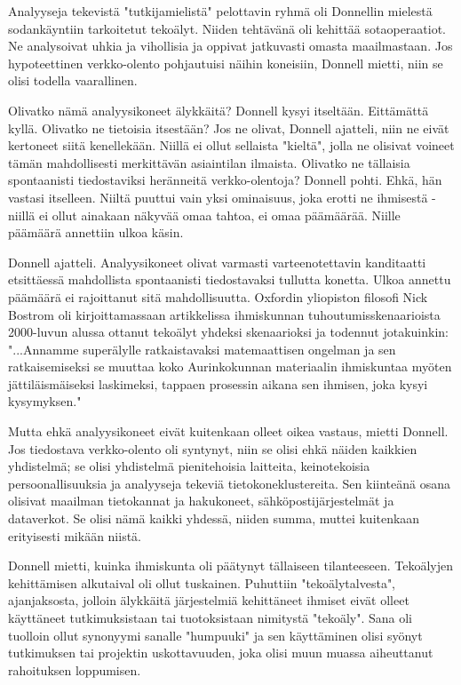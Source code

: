Analyyseja tekevistä "tutkijamielistä" pelottavin ryhmä oli Donnellin mielestä sodankäyntiin tarkoitetut tekoälyt. Niiden tehtävänä oli kehittää sotaoperaatiot. Ne analysoivat uhkia ja vihollisia ja oppivat jatkuvasti omasta maailmastaan. Jos hypoteettinen verkko-olento pohjautuisi näihin koneisiin, Donnell mietti, niin se olisi todella vaarallinen.


Olivatko nämä analyysikoneet älykkäitä? Donnell kysyi itseltään. Eittämättä kyllä. Olivatko ne tietoisia itsestään? Jos ne olivat, Donnell ajatteli, niin ne eivät kertoneet siitä kenellekään. Niillä ei ollut sellaista "kieltä", jolla ne olisivat voineet tämän mahdollisesti merkittävän asiaintilan ilmaista. Olivatko ne tällaisia spontaanisti tiedostaviksi heränneitä verkko-olentoja? Donnell pohti. Ehkä, hän vastasi itselleen. Niiltä puuttui vain yksi ominaisuus, joka erotti ne ihmisestä - niillä ei ollut ainakaan näkyvää omaa tahtoa, ei omaa päämäärää. Niille päämäärä annettiin ulkoa käsin.


Donnell ajatteli. Analyysikoneet olivat varmasti varteenotettavin kanditaatti etsittäessä mahdollista spontaanisti tiedostavaksi tullutta konetta. Ulkoa annettu päämäärä ei rajoittanut sitä mahdollisuutta. Oxfordin yliopiston filosofi Nick Bostrom oli kirjoittamassaan artikkelissa ihmiskunnan tuhoutumisskenaarioista 2000-luvun alussa ottanut tekoälyt yhdeksi skenaarioksi ja todennut jotakuinkin: "...Annamme superälylle ratkaistavaksi matemaattisen ongelman ja sen ratkaisemiseksi se muuttaa koko Aurinkokunnan materiaalin ihmiskuntaa myöten jättiläismäiseksi laskimeksi, tappaen prosessin aikana sen ihmisen, joka kysyi kysymyksen."


Mutta ehkä analyysikoneet eivät kuitenkaan olleet oikea vastaus, mietti Donnell. Jos tiedostava verkko-olento oli syntynyt, niin se olisi ehkä näiden kaikkien yhdistelmä; se olisi yhdistelmä pienitehoisia laitteita, keinotekoisia persoonallisuuksia ja analyyseja tekeviä tietokoneklustereita. Sen kiinteänä osana olisivat maailman tietokannat ja hakukoneet, sähköpostijärjestelmät ja dataverkot. Se olisi nämä kaikki yhdessä, niiden summa, muttei kuitenkaan erityisesti mikään niistä.


Donnell mietti, kuinka ihmiskunta oli päätynyt tällaiseen tilanteeseen. Tekoälyjen kehittämisen alkutaival oli ollut tuskainen. Puhuttiin "tekoälytalvesta", ajanjaksosta, jolloin älykkäitä järjestelmiä kehittäneet ihmiset eivät olleet käyttäneet tutkimuksistaan tai tuotoksistaan nimitystä "tekoäly". Sana oli tuolloin ollut synonyymi sanalle "humpuuki" ja sen käyttäminen olisi syönyt tutkimuksen tai projektin uskottavuuden, joka olisi muun muassa aiheuttanut rahoituksen loppumisen.


